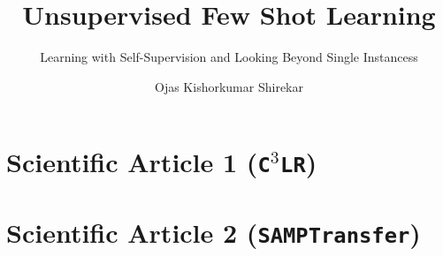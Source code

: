 \documentclass[whitelogo]{TUD-report2020}
\newcommand{\ccclr}{\texttt{C$^3$LR}}
\def\samptr{\texttt{SAMPTransfer}}
\begin{document}
\captionsetup{format=plain, font=small, labelfont=bf, justification=RaggedRight}
\frontmatter


\title[tudelft-white]{Unsupervised Few Shot Learning}
\subtitle[tudelft-white]{Learning with Self-Supervision and Looking Beyond Single Instancess}
\author[tudelft-white]{Ojas Kishorkumar Shirekar}
\makecover[split]






\tableofcontents

\mainmatter



\chapter{Scientific Article 1 (\ccclr)}\label{chap:c3lr-art}


\chapter{Scientific Article 2 (\samptr)}\label{chap:samp-transfer-art}

% 
\end{document}
